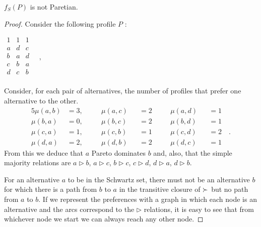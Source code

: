 \begin{theorem}
	$f_{S}(P)$ is not Paretian.
\end{theorem}
\begin{proof}
	\label{ex:schwartzPareto}
	Consider the following profile $P$ \citep{Fishburn1977}:
	\begin{center}
		$
		\begin{array}{ccc}
			1 & 1 & 1 \\
			a &	d & c \\
			b &	a & d \\
			c &	b & a \\
			d & c & b \\
		\end{array} \quad, 
		$
	\end{center}
	Consider, for each pair of alternatives, the number of profiles that prefer one alternative to the other.
	\begin{alignat*}{5}
		\mu(a,b)&=3, \quad && \mu(a,c)&&=2  \quad && \mu(a,d)&&=1 \\ 
		\mu(b,a)&=0, \quad && \mu(b,c)&&=2  \quad && \mu(b,d)&&=1  \\
		\mu(c,a)&=1, \quad && \mu(c,b)&&=1  \quad && \mu(c,d)&&=2  \quad.\\
		\mu(d,a)&=2, \quad && \mu(d,b)&&=2  \quad && \mu(d,c)&&=1 
	\end{alignat*}
	From this we deduce that $a$ Pareto dominates $b$ and, also, that the simple majority relations are $a \rhd b$, $a \rhd c$, $b \rhd c$, $c \rhd d$, $d \rhd a$, $d \rhd b$.
	
	For an alternative $a$ to be in the Schwartz set, there must not be an alternative $b$ for which there is a path from $b$ to $a$ in the transitive closure of $\succ$ but no path from $a$ to $b$.
	If we represent the preferences with a graph in which each node is an alternative and the arcs correspond to the $\rhd$ relations, it is easy to see that from whichever node we start we can always reach any other node.

	\begin{minipage}{.45\textwidth}
	\raggedright
\end{minipage}
\end{proof}
